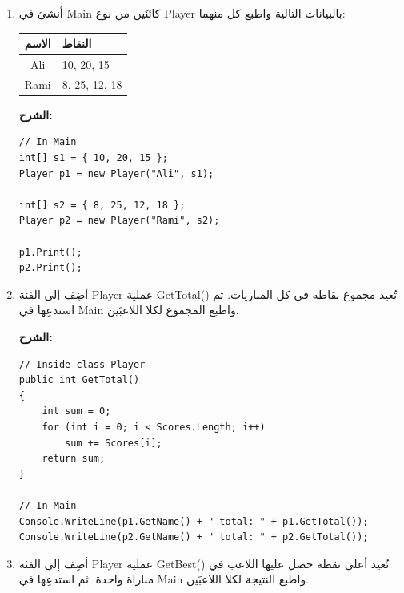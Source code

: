 \documentclass[14pt]{extarticle}
\begin{document}
\begin{enumerate}

\item
أنشئ في \textenglish{Main} كائنَين من نوع \textenglish{Player} بالبيانات التالية
واطبع كل منهما:

\begin{center}
\begin{tabular}{|c|l|}
\hline
\textbf{الاسم} & \textbf{النقاط} \\
\hline
\textenglish{Ali}  & \textenglish{10, 20, 15} \\
\textenglish{Rami} & \textenglish{8, 25, 12, 18} \\
\hline
\end{tabular}
\end{center}

\ifwithsols
\textbf{الشرح:}
\begin{english}
{\small
\begin{verbatim}
// In Main
int[] s1 = { 10, 20, 15 };
Player p1 = new Player("Ali", s1);

int[] s2 = { 8, 25, 12, 18 };
Player p2 = new Player("Rami", s2);

p1.Print();
p2.Print();
\end{verbatim}
}
\end{english}
\clearpage
\fi

\item
أضِف إلى الفئة \textenglish{Player} عملية \textenglish{GetTotal()} تُعيد مجموع نقاطه
في كل المباريات.
ثم استدعِها في \textenglish{Main} واطبع المجموع لكلا اللاعبَين.

\ifwithsols
\textbf{الشرح:}
\begin{english}
{\small
\begin{verbatim}
// Inside class Player
public int GetTotal()
{
    int sum = 0;
    for (int i = 0; i < Scores.Length; i++)
        sum += Scores[i];
    return sum;
}

// In Main
Console.WriteLine(p1.GetName() + " total: " + p1.GetTotal());
Console.WriteLine(p2.GetName() + " total: " + p2.GetTotal());
\end{verbatim}
}
\end{english}
\clearpage
\fi

\item
أضِف إلى الفئة \textenglish{Player} عملية \textenglish{GetBest()} تُعيد أعلى نقطة
حصل عليها اللاعب في مباراة واحدة.
ثم استدعِها في \textenglish{Main} واطبع النتيجة لكلا اللاعبَين.


\end{enumerate}
\end{document}
